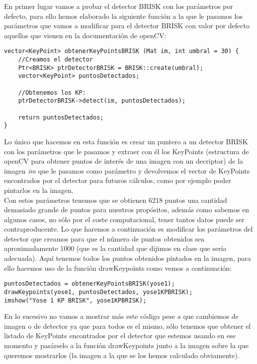 \documentclass[10pt,a4paper]{article}
\begin{document}
En primer lugar vamos a probar el detector BRISK con los parámetros por defecto, para ello hemos elaborado la siguiente función a la que le pasamos los parámetros que vamos a modificar para el detector BRISK con valor por defecto aquellos que vienen en la documentación de openCV:\\

\begin{lstlisting}
vector<KeyPoint> obtenerKeyPointsBRISK (Mat im, int umbral = 30) {
	//Creamos el detector
	Ptr<BRISK> ptrDetectorBRISK = BRISK::create(umbral);
	vector<KeyPoint> puntosDetectados;
	
	//Obtenemos los KP:
	ptrDetectorBRISK->detect(im, puntosDetectados);

	return puntosDetectados;
}
\end{lstlisting}

Lo único que hacemos en esta función es crear un puntero a un detector BRISK con los parámetros que le pasamos y extraer con él los KeyPoints (estructura de openCV para obtener puntos de interés de una imagen con un decriptor) de la imagen \textit{im} que le pasamos como parámetro y devolvemos el vector de KeyPoints encontrados por el detector para futuros cálculos, como por ejemplo poder pintarlos en la imagen.\\

Con estos parámetros tenemos que se obtienen 6218 puntos una cantidad demasiado grande de puntos para nuestros propósitos, además como sabemos en algunos casos, no sólo por el coste computacional, tener tantos datos puede ser contraproducente. Lo que haremos a continuación es modificar los parámetros del detector que creamos para que el número de puntos obtenidos sea aproximadamente 1000 (que es la cantidad que dijimos en clase que sería adecuada). Aquí tenemos todos los puntos obtenidos pintados en la imagen, para ello hacemos uso de la función drawKeypoints como vemos a continuación:\\

\begin{lstlisting}
puntosDetectados = obtenerKeyPointsBRISK(yose1);
drawKeypoints(yose1, puntosDetectados, yose1KPBRISK);
imshow("Yose 1 KP BRISK", yose1KPBRISK);
\end{lstlisting}

En lo sucesivo no vamos a mostrar más este código pese a que cambiemos de imagen o de detector ya que para todos es el mismo, sólo tenemos que obtener el listado de KeyPoints encontrados por el detector que estemos usando en ese momento y pasárselo a la función drawKeypoints junto a la imagen sobre la que queremos mostrarlos (la imagen a la que se los hemos calculado obviamente).
\end{document}
